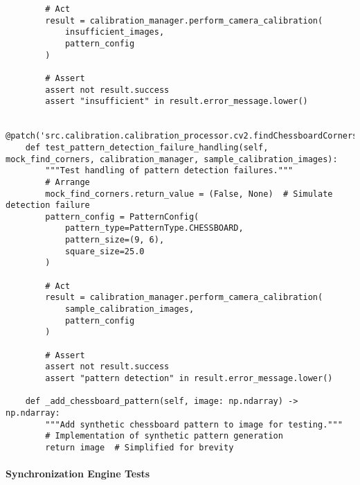 \documentclass[12pt,a4paper]{article}
\begin{document}
\begin{verbatim}
        # Act
        result = calibration_manager.perform_camera_calibration(
            insufficient_images, 
            pattern_config
        )
        
        # Assert
        assert not result.success
        assert "insufficient" in result.error_message.lower()
    
    @patch('src.calibration.calibration_processor.cv2.findChessboardCorners')
    def test_pattern_detection_failure_handling(self, mock_find_corners, calibration_manager, sample_calibration_images):
        """Test handling of pattern detection failures."""
        # Arrange
        mock_find_corners.return_value = (False, None)  # Simulate detection failure
        pattern_config = PatternConfig(
            pattern_type=PatternType.CHESSBOARD,
            pattern_size=(9, 6),
            square_size=25.0
        )
        
        # Act
        result = calibration_manager.perform_camera_calibration(
            sample_calibration_images, 
            pattern_config
        )
        
        # Assert
        assert not result.success
        assert "pattern detection" in result.error_message.lower()
    
    def _add_chessboard_pattern(self, image: np.ndarray) -> np.ndarray:
        """Add synthetic chessboard pattern to image for testing."""
        # Implementation of synthetic pattern generation
        return image  # Simplified for brevity
\end{verbatim}

\paragraph{Synchronization Engine Tests}
\end{document}
